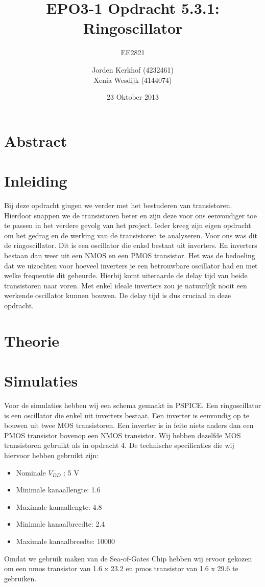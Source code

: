 \documentclass{scrartcl}  %
\author{Jorden {Kerkhof} (4232461)  \\{Xenia Wesdijk} (4144074)}
\title{EPO3-1   Opdracht 5.3.1: Ringoscillator}
\subtitle{EE2821}
\date{23 Oktober 2013}
\begin{document}
\maketitle
\vspace{80 mm}
\section*{Abstract}

\newpage
\setlength{\cftbeforetoctitleskip}{-3em}
\tableofcontents
\newpage
{}
\section{Inleiding}
Bij deze opdracht gingen we verder met het bestuderen van transistoren. Hierdoor snappen we de transistoren beter en zijn deze voor ons eenvoudiger toe te passen in het verdere gevolg van het project. Ieder kreeg zijn eigen opdracht om het gedrag en de werking van de transistoren te analyseren. Voor ons was dit de ringoscillator. Dit is een oscillator die enkel bestaat uit inverters. En inverters bestaan dan weer uit een NMOS en een PMOS transistor. Het was de bedoeling dat we uizochten voor hoeveel inverters je een betrouwbare oscillator had en met welke frequentie dit gebeurde. Hierbij komt uiteraarde de delay tijd van beide transistoren naar voren. Met enkel ideale inverters zou je natuurlijk nooit een werkende oscillator kunnen bouwen. De delay tijd is dus cruciaal in deze opdracht.  

\section{Theorie}

\section{Simulaties}
Voor de simulaties hebben wij een schema gemaakt in PSPICE. Een ringoscillator is een oscillator die enkel uit inverters bestaat. Een inverter is eenvoudig op te bouwen uit twee MOS transistoren. Een inverter is in feite niets anders dan een PMOS transistor bovenop een NMOS transistor. Wij hebben dezelfde MOS transistoren gebruikt als in opdracht 4. De technische specificaties die wij hiervoor hebben gebruikt zijn:
\begin{itemize}
	\item Nominale $V_{DD}$ : 5 V
	\item Minimale kanaallengte: 1.6  \micro\meter
	\item Maximale kanaallengte: 4.8 \micro\meter
	\item Minimale kanaalbreedte: 2.4 \micro\meter
	\item Maximale kanaalbreedte: 10000 \micro\meter
\end{itemize}
Omdat we gebruik maken van de Sea-of-Gates Chip hebben wij ervoor gekozen om een nmos transistor van 1.6 x 23.2 \micro\meter en pmos transistor van 1.6 x 29.6 \micro\meter te gebruiken.
\end{document}
